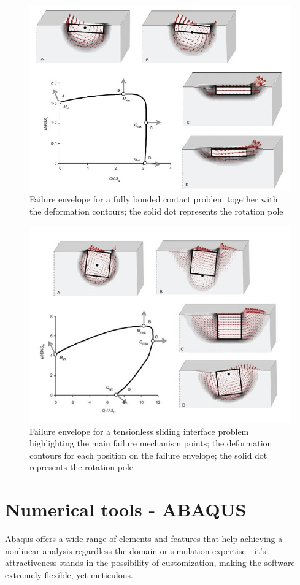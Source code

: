 \documentclass[11pt,a4paper]{report}
\begin{document}
\begin{figure}[h!]
	\centering
	\includegraphics[width=0.8\linewidth]{"fbc_contour"}
	\caption{Failure envelope for a fully bonded contact problem together with the deformation contours; the solid dot represents the rotation pole}
	\label{contour}
\end{figure}

\begin{figure}[h!]
	\centering
	\includegraphics[width=0.9\linewidth]{"MQN"}
	\caption{Failure envelope for a tensionless sliding interface problem highlighting the main failure mechanism points; the deformation contours for each position on the failure envelope; the solid dot represents the rotation pole}
	\label{MQN}
\end{figure}

\newpage
\section{Numerical tools - ABAQUS}
Abaqus \cite{hibbett1998abaqus} offers a wide range of elements and features that help achieving a nonlinear analysis regardless the domain or simulation expertise - it's attractiveness stands in the possibility of customization, making the software extremely flexible, yet meticulous. 
\end{document}
